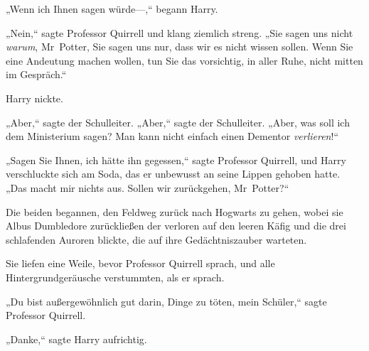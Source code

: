 „Wenn ich Ihnen sagen würde—,“ begann Harry.

„Nein,“ sagte Professor Quirrell und klang ziemlich streng. „Sie sagen uns nicht \emph{warum}, Mr~Potter, Sie sagen uns nur, dass wir es nicht wissen sollen. Wenn Sie eine Andeutung machen wollen, tun Sie das vorsichtig, in aller Ruhe, nicht mitten im Gespräch.“

Harry nickte.

„Aber,“ sagte der Schulleiter. „Aber,“ sagte der Schulleiter. „Aber, was soll ich dem Ministerium sagen? Man kann nicht einfach einen Dementor \emph{verlieren}!“

„Sagen Sie Ihnen, ich hätte ihn gegessen,“ sagte Professor Quirrell, und Harry verschluckte sich am Soda, das er unbewusst an seine Lippen gehoben hatte. „Das macht mir nichts aus. Sollen wir zurückgehen, Mr~Potter?“

Die beiden begannen, den Feldweg zurück nach Hogwarts zu gehen, wobei sie Albus Dumbledore zurückließen der verloren auf den leeren Käfig und die drei schlafenden Auroren blickte, die auf ihre Gedächtniszauber warteten.


Sie liefen eine Weile, bevor Professor Quirrell sprach, und alle Hintergrundgeräusche verstummten, als er sprach.

„Du bist außergewöhnlich gut darin, Dinge zu töten, mein Schüler,“ sagte Professor Quirrell.

„Danke,“ sagte Harry aufrichtig.

